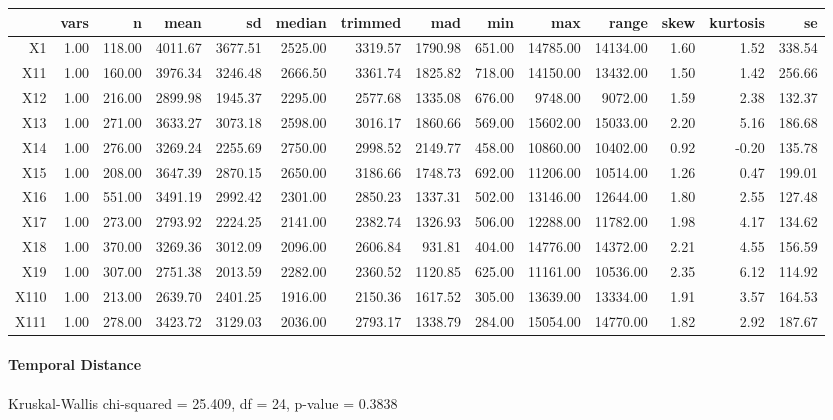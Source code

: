 \begin{tabular}{rrrrrrrrrrrrrr}
  \hline
 & vars & n & mean & sd & median & trimmed & mad & min & max & range & skew & kurtosis & se \\ 
  \hline
X1 & 1.00 & 118.00 & 4011.67 & 3677.51 & 2525.00 & 3319.57 & 1790.98 & 651.00 & 14785.00 & 14134.00 & 1.60 & 1.52 & 338.54 \\ 
  X11 & 1.00 & 160.00 & 3976.34 & 3246.48 & 2666.50 & 3361.74 & 1825.82 & 718.00 & 14150.00 & 13432.00 & 1.50 & 1.42 & 256.66 \\ 
  X12 & 1.00 & 216.00 & 2899.98 & 1945.37 & 2295.00 & 2577.68 & 1335.08 & 676.00 & 9748.00 & 9072.00 & 1.59 & 2.38 & 132.37 \\ 
  X13 & 1.00 & 271.00 & 3633.27 & 3073.18 & 2598.00 & 3016.17 & 1860.66 & 569.00 & 15602.00 & 15033.00 & 2.20 & 5.16 & 186.68 \\ 
  X14 & 1.00 & 276.00 & 3269.24 & 2255.69 & 2750.00 & 2998.52 & 2149.77 & 458.00 & 10860.00 & 10402.00 & 0.92 & -0.20 & 135.78 \\ 
  X15 & 1.00 & 208.00 & 3647.39 & 2870.15 & 2650.00 & 3186.66 & 1748.73 & 692.00 & 11206.00 & 10514.00 & 1.26 & 0.47 & 199.01 \\ 
  X16 & 1.00 & 551.00 & 3491.19 & 2992.42 & 2301.00 & 2850.23 & 1337.31 & 502.00 & 13146.00 & 12644.00 & 1.80 & 2.55 & 127.48 \\ 
  X17 & 1.00 & 273.00 & 2793.92 & 2224.25 & 2141.00 & 2382.74 & 1326.93 & 506.00 & 12288.00 & 11782.00 & 1.98 & 4.17 & 134.62 \\ 
  X18 & 1.00 & 370.00 & 3269.36 & 3012.09 & 2096.00 & 2606.84 & 931.81 & 404.00 & 14776.00 & 14372.00 & 2.21 & 4.55 & 156.59 \\ 
  X19 & 1.00 & 307.00 & 2751.38 & 2013.59 & 2282.00 & 2360.52 & 1120.85 & 625.00 & 11161.00 & 10536.00 & 2.35 & 6.12 & 114.92 \\ 
  X110 & 1.00 & 213.00 & 2639.70 & 2401.25 & 1916.00 & 2150.36 & 1617.52 & 305.00 & 13639.00 & 13334.00 & 1.91 & 3.57 & 164.53 \\ 
  X111 & 1.00 & 278.00 & 3423.72 & 3129.03 & 2036.00 & 2793.17 & 1338.79 & 284.00 & 15054.00 & 14770.00 & 1.82 & 2.92 & 187.67 \\ 
   \hline
\end{tabular}

\paragraph{Temporal Distance}
Kruskal-Wallis chi-squared = 25.409, df = 24, p-value = 0.3838

